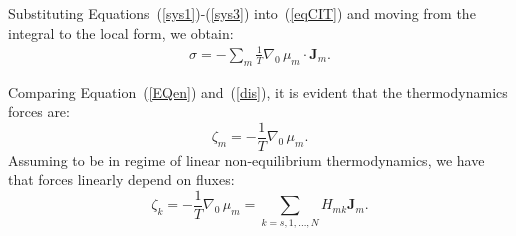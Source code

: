 Substituting Equations~(\ref{sys1})-(\ref{sys3}) into~(\ref{eqCIT}) and moving from the integral to the local form, we obtain:
\begin{equation}
\begin{aligned}
\sigma = -  \sum_m \frac{1}{T}\nabla_0 \,\mu_m \cdot \mathbf{J}_m. \label{EQen}
\end{aligned} 
\end{equation}

Comparing Equation~(\ref{EQen}) and~(\ref{dis}), it is evident that the thermodynamics forces are:
\begin{equation}
\zeta_m = -\frac{1}{T} \nabla_0 \,\mu_m. \label{vflow1}
\end{equation}
Assuming to be in regime of linear non-equilibrium thermodynamics, we have that forces linearly depend on fluxes:
\begin{equation}
\zeta_k = -\frac{1}{T} \nabla_0 \,\mu_m =\sum_{k=s,1,\ldots,N} H_{mk} \mathbf{J}_m. \label{dif}
\end{equation}


